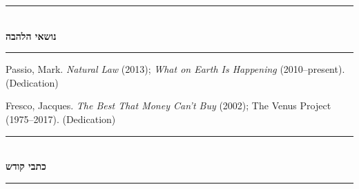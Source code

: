 \documentclass[10pt, openany, oneside]{book}
\renewcommand{\normalsize}{\fontsize{10}{13}\selectfont}
\renewcommand{\footnotesize}{\fontsize{8.5}{11}\selectfont}
\begin{document}
\vspace{1.5em}

\begin{center}
    \rule{0.3\textwidth}{0.4pt}\\[0.5em]
    {\normalsize\bfseries\textsc{נושאי הלהבה}}\\[0.3em]
    \rule{0.3\textwidth}{0.4pt}
\end{center}

\vspace{1em}

{\footnotesize
\begin{english}
\noindent Passio, Mark. \textit{Natural Law} (2013); \textit{What on Earth Is Happening} (2010--present). (Dedication)

\vspace{0.3em}

\noindent Fresco, Jacques. \textit{The Best That Money Can't Buy} (2002); The Venus Project (1975--2017). (Dedication)
\end{english}
}

\vspace{1.5em}

\begin{center}
    \rule{0.3\textwidth}{0.4pt}\\[0.5em]
    {\normalsize\bfseries\textsc{כתבי קודש}}\\[0.3em]
    \rule{0.3\textwidth}{0.4pt}
\end{center}

\vspace{1em}
\end{document}
